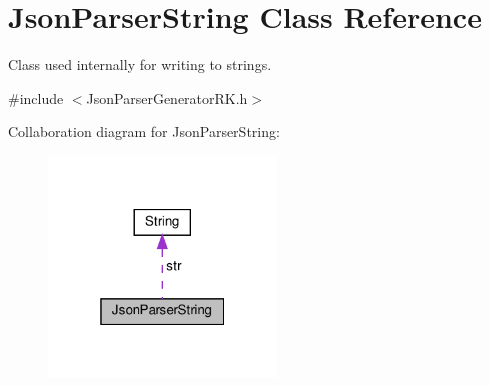 \hypertarget{class_json_parser_string}{}\section{Json\+Parser\+String Class Reference}
\label{class_json_parser_string}


Class used internally for writing to strings.  




{\ttfamily \#include $<$Json\+Parser\+Generator\+R\+K.\+h$>$}



Collaboration diagram for Json\+Parser\+String\+:\nopagebreak
\begin{figure}[H]
\begin{center}
\leavevmode
\includegraphics[width=172pt]{class_json_parser_string__coll__graph}
\end{center}
\end{figure}
